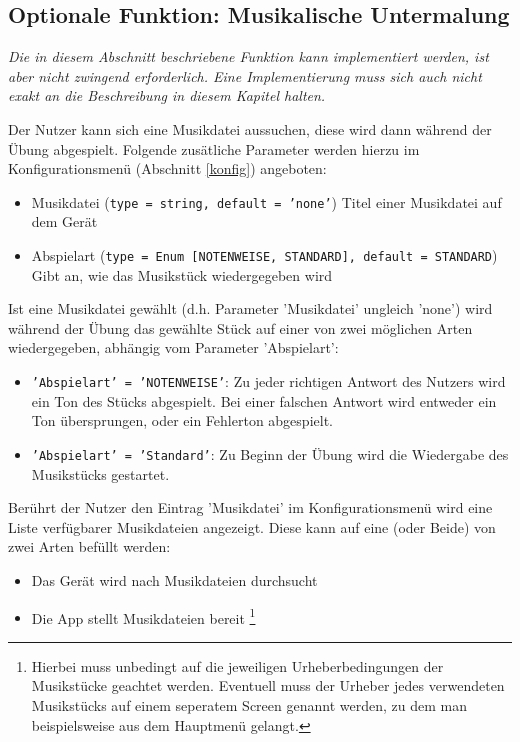 \subsection{Optionale Funktion: Musikalische Untermalung}
\begin{addmargin}[25pt]{0pt}
\textit{Die in diesem Abschnitt beschriebene Funktion kann implementiert werden, ist aber nicht zwingend erforderlich.
  Eine Implementierung muss sich auch nicht exakt an die Beschreibung in diesem Kapitel halten.
}
\end{addmargin}
Der Nutzer kann sich eine Musikdatei aussuchen, diese wird dann während der Übung abgespielt.
Folgende zusätliche Parameter werden hierzu im Konfigurationsmenü (Abschnitt \ref{konfig}) angeboten:
\begin{itemize}[itemsep=0pt]
  \item Musikdatei (\texttt{type = string, default = 'none'})\newline
  Titel einer Musikdatei auf dem Gerät
  \item Abspielart (\texttt{type = Enum [NOTENWEISE, STANDARD], default = STANDARD})\newline
  Gibt an, wie das Musikstück wiedergegeben wird
\end{itemize}
Ist eine Musikdatei gewählt (d.h. Parameter 'Musikdatei' ungleich 'none') wird während der Übung das gewählte
Stück auf einer von zwei möglichen Arten wiedergegeben, abhängig vom Parameter 'Abspielart':
\begin{itemize}[itemsep=0pt]
  \item \texttt{'Abspielart' = 'NOTENWEISE'}:\newline
  Zu jeder richtigen Antwort des Nutzers wird ein Ton des Stücks abgespielt.
  Bei einer falschen Antwort wird entweder ein Ton übersprungen, oder ein Fehlerton abgespielt.
  \item \texttt{'Abspielart' = 'Standard'}:\newline
  Zu Beginn der Übung wird die Wiedergabe des Musikstücks gestartet.
\end{itemize}
Berührt der Nutzer den Eintrag 'Musikdatei' im Konfigurationsmenü wird eine Liste verfügbarer Musikdateien angezeigt.
Diese kann auf eine (oder Beide) von zwei Arten befüllt werden:
\begin{itemize}[itemsep=0pt]
  \item Das Gerät wird nach Musikdateien durchsucht
  \item Die App stellt Musikdateien bereit
    \footnote{
      Hierbei muss unbedingt auf die jeweiligen Urheberbedingungen der Musikstücke geachtet werden. Eventuell muss
      der Urheber jedes verwendeten Musikstücks auf einem seperatem Screen genannt werden,
      zu dem man beispielsweise aus dem Hauptmenü gelangt.
    }
\end{itemize}

